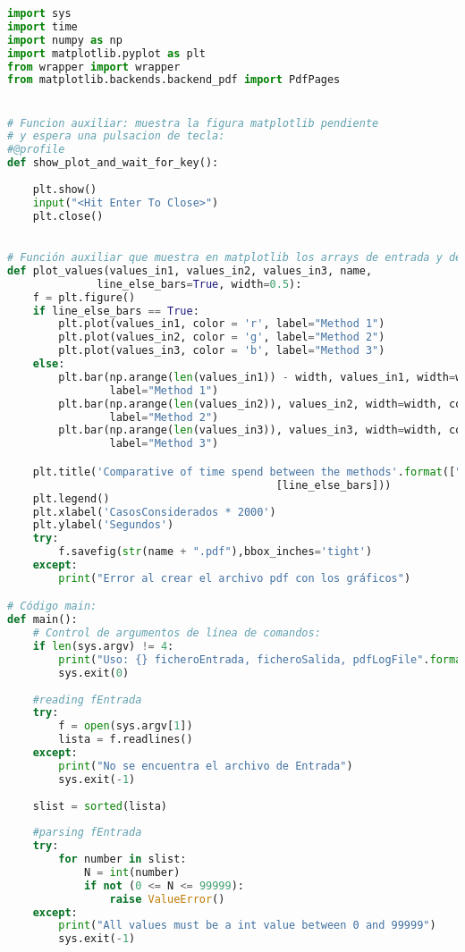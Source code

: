 \documentclass[10pt,journal,compsoc]{IEEEtran}
\begin{document}
\begin{lstlisting}[basicstyle=\tiny, language=Python]
import sys
import time
import numpy as np
import matplotlib.pyplot as plt
from wrapper import wrapper 
from matplotlib.backends.backend_pdf import PdfPages


# Funcion auxiliar: muestra la figura matplotlib pendiente
# y espera una pulsacion de tecla:
#@profile
def show_plot_and_wait_for_key():
    
    plt.show()
    input("<Hit Enter To Close>")
    plt.close()

    
# Función auxiliar que muestra en matplotlib los arrays de entrada y de salida:
def plot_values(values_in1, values_in2, values_in3, name,
			  line_else_bars=True, width=0.5):
    f = plt.figure()
    if line_else_bars == True:
        plt.plot(values_in1, color = 'r', label="Method 1")
        plt.plot(values_in2, color = 'g', label="Method 2") 
        plt.plot(values_in3, color = 'b', label="Method 3") 
    else:
        plt.bar(np.arange(len(values_in1)) - width, values_in1, width=width, color='r', 
                label="Method 1")
        plt.bar(np.arange(len(values_in2)), values_in2, width=width, color='g', 
                label="Method 2")
        plt.bar(np.arange(len(values_in3)), values_in3, width=width, color='b', 
                label="Method 3")

    plt.title('Comparative of time spend between the methods'.format(["bars", "lines"]
    								      [line_else_bars]))
    plt.legend()
    plt.xlabel('CasosConsiderados * 2000')
    plt.ylabel('Segundos')
    try:
        f.savefig(str(name + ".pdf"),bbox_inches='tight')
    except:
        print("Error al crear el archivo pdf con los gráficos")

# Código main:
def main():   
    # Control de argumentos de línea de comandos:
    if len(sys.argv) != 4:
        print("Uso: {} ficheroEntrada, ficheroSalida, pdfLogFile".format(sys.argv[0]))
        sys.exit(0)
        
    #reading fEntrada
    try:
        f = open(sys.argv[1])
        lista = f.readlines()
    except:
        print("No se encuentra el archivo de Entrada")
        sys.exit(-1)
        
    slist = sorted(lista)
    
    #parsing fEntrada
    try:
        for number in slist:
            N = int(number)
            if not (0 <= N <= 99999):
                raise ValueError()
    except:
        print("All values must be a int value between 0 and 99999")
        sys.exit(-1)
        

\end{lstlisting}
\end{document}

